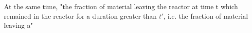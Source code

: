 At the same time, "the fraction of material leaving the reactor at time t which remained in the reactor for a duration greater than $t'$, i.e. the fraction of material leaving a"  